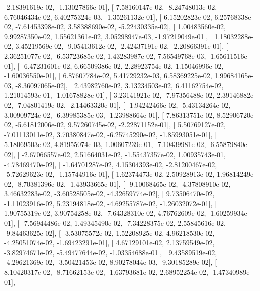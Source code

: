 \documentclass{article}
\begin{document}
         -2.18391619e-02,  -1.13027866e-01],
       [  7.58160147e-02,  -8.24748013e-02,   6.76046434e-02,
          6.40275324e-03,  -1.35261132e-01],
       [  6.15202823e-02,   6.25768338e-02,  -7.61453398e-02,
          3.58388690e-02,  -5.22430335e-02],
       [  1.00483560e-02,   9.99287350e-02,   1.55621361e-02,
          3.05298947e-03,  -1.97219049e-01],
       [  1.18032288e-02,   3.45219569e-02,  -9.05413612e-02,
         -2.42437191e-02,  -2.20866391e-01],
       [  2.36251077e-02,  -6.53723685e-02,   1.43283987e-02,
          7.56549768e-03,  -1.65611516e-01],
       [ -6.47231601e-02,   6.66509386e-02,   2.28923754e-02,
          1.15046996e-02,  -1.60036550e-01],
       [  6.87607784e-02,   5.41729232e-03,   6.58369225e-02,
          1.99684165e-03,  -8.36097065e-02],
       [  2.43982760e-02,   3.13234503e-02,   6.41162754e-02,
          1.21014593e-01,  -1.01678828e-01],
       [  3.23141921e-02,  -7.97356488e-02,   2.39146882e-02,
         -7.04801419e-02,  -2.14463320e-01],
       [ -1.94242466e-02,  -5.43134264e-02,   3.00909724e-02,
         -6.39985385e-03,  -1.23988664e-01],
       [  7.86313751e-02,   8.52906720e-02,  -5.61812006e-02,
          9.57260745e-02,  -2.22871152e-01],
       [  5.50769127e-02,  -7.01113011e-02,   3.70380847e-02,
         -6.25745290e-02,  -1.85993051e-01],
       [  5.18069503e-02,   4.81955074e-03,   1.00607239e-01,
         -7.10439981e-02,  -6.55879840e-02],
       [ -2.67066557e-02,   2.51664031e-02,  -1.55437357e-02,
          1.00935743e-01,  -4.78469470e-02],
       [ -1.64701287e-02,   4.15304393e-02,  -2.81200467e-02,
         -5.72629623e-02,  -1.15744916e-01],
       [  1.62374473e-02,   2.50928913e-02,   1.96814249e-02,
         -8.70381396e-02,  -1.43933665e-01],
       [ -9.10068465e-02,  -4.37808910e-02,   3.46632283e-02,
         -3.60528505e-02,  -4.32659774e-02],
       [  9.73506470e-02,  -1.11023916e-02,   5.23194818e-02,
         -4.69255787e-02,  -1.26032072e-01],
       [  1.90755319e-02,   3.90754258e-02,  -7.64328310e-02,
          4.76762609e-02,  -1.60259934e-01],
       [ -7.56944486e-02,   1.49345490e-02,  -7.34228375e-02,
          2.55845616e-02,  -9.84463625e-02],
       [ -3.53075572e-02,   1.52208925e-02,   4.96218530e-02,
         -4.25051074e-02,  -1.69423291e-01],
       [  4.67129101e-02,   2.13759549e-02,  -3.82974671e-02,
         -5.49477644e-02,  -1.03354688e-01],
       [  9.43589519e-02,  -4.29621369e-02,  -3.50421453e-02,
          8.90278044e-03,  -9.30185289e-02],
       [  8.10420317e-02,  -8.71662153e-02,  -1.63793681e-02,
          2.68952254e-02,  -1.47340989e-01],
\end{document}
